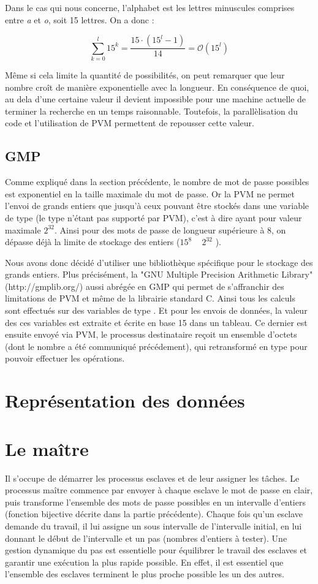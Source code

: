 \documentclass[a4paper,11pt]{article}
\begin{document}
Dans le cas qui nous concerne, l'alphabet est les lettres minuscules comprises entre \emph{a} et \emph{o}, soit 15 lettres. On a donc :

\[
\sum_{k=0}^{l}15^k = \frac{15 \cdot (15^l - 1)}{14} = \mathcal{O}(15^l)
\]

Même si cela limite la quantité de possibilités, on peut remarquer que leur nombre croît de manière exponentielle avec la longueur. En conséquence de quoi, au dela d'une certaine valeur il devient impossible pour une machine actuelle de terminer la recherche en un temps raisonnable. Toutefois, la parallèlisation du code et l'utilisation de PVM permettent de repousser cette valeur.

\subsection{GMP}
Comme expliqué dans la section précédente, le nombre de mot de passe possibles est exponentiel en la taille maximale du mot de passe. Or la PVM ne permet l'envoi de grands entiers que jusqu'à ceux pouvant être stockés dans une variable de type   (le type  n'étant pas supporté par PVM), c'est à dire ayant pour valeur maximale $2^{32}$. Ainsi pour des mots de passe de longueur supérieure à 8, on dépasse déjà la limite de stockage des entiers ($15^{8}$ ~ $2^{32}$ ). 

Nous avons donc décidé d'utiliser une bibliothèque spécifique pour le stockage des grands entiers. Plus précisément, la "GNU Multiple Precision Arithmetic Library" (http://gmplib.org/) aussi abrégée en GMP qui permet de s'affranchir des limitations de PVM et même de la librairie standard C.
Ainsi tous les calculs sont effectués sur des variables de type . Et pour les envois de données, la valeur des ces variables est extraite et écrite en base 15 dans un tableau. Ce dernier est ensuite envoyé via PVM, le processus destinataire reçoit un ensemble d'octets (dont le nombre a été communiqué précédement), qui retransformé en type  pour pouvoir effectuer les opérations.

\section{Représentation des données}


\section{Le maître}
Il s'occupe de démarrer les processus esclaves et de leur assigner les tâches. Le processus maître commence par envoyer à chaque esclave le mot de passe en clair, puis transforme l'ensemble des mots de passe possibles en un intervalle d'entiers (fonction bijective décrite dans la partie précédente). Chaque fois qu'un esclave demande du travail, il lui assigne un sous intervalle de l'intervalle initial, en lui donnant le début de l'intervalle et un pas (nombres d'entiers à tester).
Une gestion dynamique du pas est essentielle pour équilibrer le travail des esclaves et garantir une exécution la plus rapide possible. En effet, il est essentiel que l'ensemble des esclaves terminent le plus proche possible les un des autres.
\end{document}
